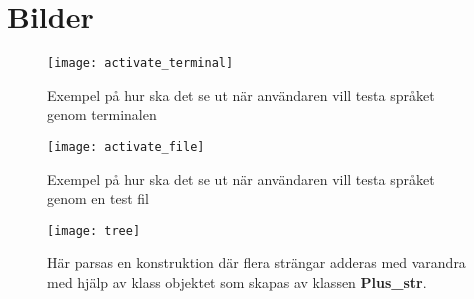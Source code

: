\documentclass{TDP019mall}
\begin{document}
\newpage
\section{Bilder}

\begin{figure}[h]
\caption{Exempel på hur ska det se ut när användaren vill testa språket genom terminalen}
\centering
\texttt{[image: activate\_terminal]}
\end{figure}

\begin{figure}[h]
\caption{Exempel på hur ska det se ut när användaren vill testa språket genom en test fil}
\centering
\texttt{[image: activate\_file]}
\end{figure}

\newpage
\begin{figure}[h]
\caption{Här parsas en konstruktion där flera strängar adderas med varandra med hjälp av klass objektet som skapas av klassen \textbf{Plus\_str}.\\ \\}
\centering
\texttt{[image: tree]}
\end{figure}
    
\end{document}
